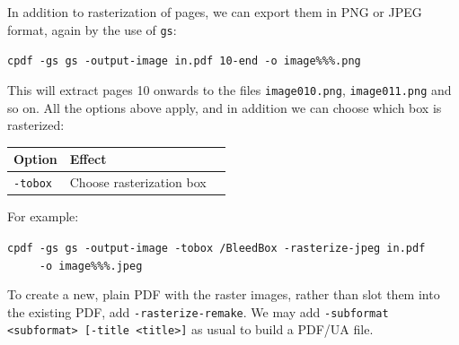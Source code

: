 \documentclass{book}
\begin{document}
\noindent In addition to rasterization of pages, we can export them in PNG or JPEG format, again by the use of \texttt{gs}:

  \begin{framed}
  \noindent\small\verb!cpdf -gs gs -output-image in.pdf 10-end -o image%%%.png!
  \end{framed}

\noindent This will extract pages 10 onwards to the files \texttt{image010.png}, \texttt{image011.png} and so on. All the options above apply, and in addition we can choose which box is rasterized:

\bigskip
\noindent\begin{tabular}{lp{8cm}l}
Option & Effect\\\hline
{\small\texttt{-tobox}} & Choose rasterization box \\
\end{tabular}
\bigskip

\noindent For example:

  \begin{framed}
  \noindent\small\verb!cpdf -gs gs -output-image -tobox /BleedBox -rasterize-jpeg in.pdf!\\
  \noindent\small\verb!     -o image%%%.jpeg!
  \end{framed}

\noindent To create a new, plain PDF with the raster images, rather than slot them into the existing PDF, add \texttt{-rasterize-remake}. We may add \texttt{-subformat <subformat> [-title <title>]} as usual to build a PDF/UA file.

\ \ \ 

\pagestyle{empty}
\thispagestyle{fancy}
\end{document}
